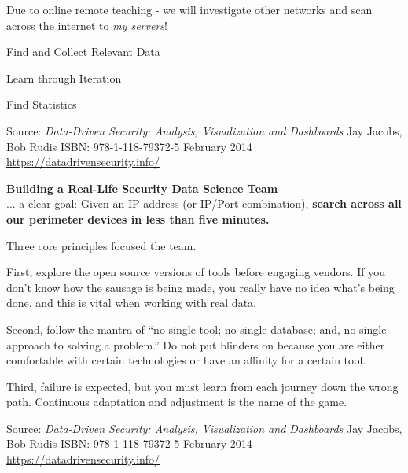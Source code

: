 \documentclass[Screen16to9,17pt]{foils}
\begin{document}
Due to online remote teaching - we will investigate other networks and scan across the internet to \emph{my servers}!




\begin{list2}
\item Find and Collect Relevant Data
\item Learn through Iteration
\item Find Statistics
\end{list2}
Source: \emph{Data-Driven Security: Analysis, Visualization and Dashboards} Jay Jacobs, Bob Rudis
ISBN: 978-1-118-79372-5 February 2014 \url{https://datadrivensecurity.info/}





{\bf Building a Real-Life Security Data Science Team}\\
... a clear goal: Given an IP address (or IP/Port combination), {\bf search across all our perimeter devices in less than five minutes.}

Three core principles focused the team.
\begin{list2}
\item First, explore the open source versions of tools before engaging vendors. If you don’t
know how the sausage is being made, you really have no idea what’s being done, and
this is vital when working with real data.
\item Second, follow the mantra of “no single tool; no single database; and, no single approach
to solving a problem.” Do not put blinders on because you are either comfortable with
certain technologies or have an affinity for a certain tool.
\item Third, failure is expected, but you must learn from each journey down the wrong path.
Continuous adaptation and adjustment is the name of the game.
\end{list2}


Source: \emph{Data-Driven Security: Analysis, Visualization and Dashboards} Jay Jacobs, Bob Rudis
ISBN: 978-1-118-79372-5 February 2014 \url{https://datadrivensecurity.info/}




\end{document}
